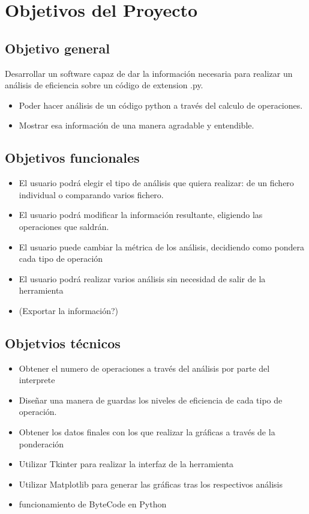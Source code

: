 
\section{Objetivos del Proyecto}

\subsection{Objetivo general}


Desarrollar un software capaz de dar la información necesaria para realizar un análisis de eficiencia sobre un código de extension .py.
\begin{itemize}
	\item Poder hacer análisis de un código python a través del calculo de operaciones.
	\item Mostrar esa información de una manera agradable y entendible.
\end{itemize}


\subsection{Objetivos funcionales}
	\begin{itemize}
	\item El usuario podrá elegir el tipo de análisis que quiera realizar: de un fichero individual o comparando varios fichero.
	\item El usuario podrá modificar la información resultante, eligiendo las operaciones que saldrán.
	\item El usuario puede cambiar la métrica de los análisis, decidiendo como pondera cada tipo de operación
	\item El usuario podrá realizar varios análisis sin necesidad de salir de la herramienta
	\item(Exportar la información?)
\end{itemize}


\subsection{Objetvios técnicos}
	\begin{itemize}
	\item Obtener el numero de operaciones a través del análisis por parte del interprete
	\item Diseñar una manera de guardas los niveles de eficiencia de cada tipo de operación.
	\item Obtener los datos finales con los que realizar la  gráficas a través de la ponderación
	\item Utilizar Tkinter para realizar la interfaz de la herramienta
	\item Utilizar Matplotlib  para generar las gráficas tras los respectivos análisis
	\item funcionamiento de ByteCode en Python
\end{itemize}
